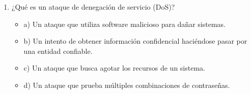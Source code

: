 \documentclass[a4paper]{article}
\begin{document}
\begin{enumerate}
    \item ¿Qué es un ataque de denegación de servicio (DoS)?
    \begin{itemize}
        \item a) Un ataque que utiliza software malicioso para dañar sistemas.
        \item b) Un intento de obtener información confidencial haciéndose pasar por una entidad confiable.
        \item c) Un ataque que busca agotar los recursos de un sistema.
        \item d) Un ataque que prueba múltiples combinaciones de contraseñas.
    \end{itemize}







\end{enumerate}
\end{document}
